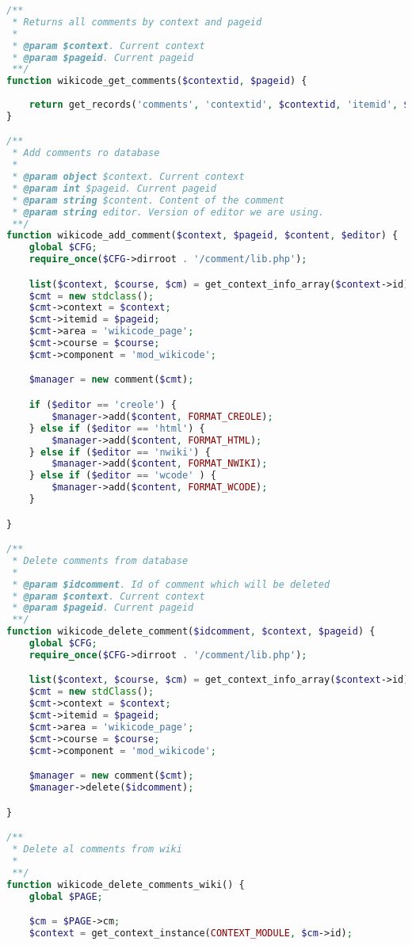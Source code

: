 \begin{lstlisting}[language=PHP]
/**
 * Returns all comments by context and pageid
 *
 * @param $context. Current context
 * @param $pageid. Current pageid
 **/
function wikicode_get_comments($contextid, $pageid) {
    
    return get_records('comments', 'contextid', $contextid, 'itemid', $pageid, 'commentarea', 'wikicode_page');
}

/**
 * Add comments ro database
 *
 * @param object $context. Current context
 * @param int $pageid. Current pageid
 * @param string $content. Content of the comment
 * @param string editor. Version of editor we are using.
 **/
function wikicode_add_comment($context, $pageid, $content, $editor) {
    global $CFG;
    require_once($CFG->dirroot . '/comment/lib.php');

    list($context, $course, $cm) = get_context_info_array($context->id);
    $cmt = new stdclass();
    $cmt->context = $context;
    $cmt->itemid = $pageid;
    $cmt->area = 'wikicode_page';
    $cmt->course = $course;
    $cmt->component = 'mod_wikicode';

    $manager = new comment($cmt);

    if ($editor == 'creole') {
        $manager->add($content, FORMAT_CREOLE);
    } else if ($editor == 'html') {
        $manager->add($content, FORMAT_HTML);
    } else if ($editor == 'nwiki') {
        $manager->add($content, FORMAT_NWIKI);
    } else if ($editor == 'wcode' ) {
    	$manager->add($content, FORMAT_WCODE);
    }

}

/**
 * Delete comments from database
 *
 * @param $idcomment. Id of comment which will be deleted
 * @param $context. Current context
 * @param $pageid. Current pageid
 **/
function wikicode_delete_comment($idcomment, $context, $pageid) {
    global $CFG;
    require_once($CFG->dirroot . '/comment/lib.php');

    list($context, $course, $cm) = get_context_info_array($context->id);
    $cmt = new stdClass();
    $cmt->context = $context;
    $cmt->itemid = $pageid;
    $cmt->area = 'wikicode_page';
    $cmt->course = $course;
    $cmt->component = 'mod_wikicode';

    $manager = new comment($cmt);
    $manager->delete($idcomment);

}

/**
 * Delete al comments from wiki
 *
 **/
function wikicode_delete_comments_wiki() {
    global $PAGE;

    $cm = $PAGE->cm;
    $context = get_context_instance(CONTEXT_MODULE, $cm->id);


\end{lstlisting}
